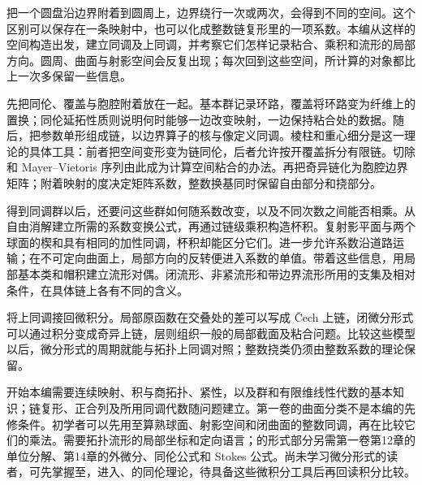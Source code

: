 
% 

\BookPartGuide
把一个圆盘沿边界附着到圆周上，边界绕行一次或两次，会得到不同的空间。这个区别可以保存在一条映射中，也可以化成整数链复形里的一项系数。本编从这样的空间构造出发，建立同调及上同调，并考察它们怎样记录粘合、乘积和流形的局部方向。圆周、曲面与射影空间会反复出现；每次回到这些空间，所计算的对象都比上一次多保留一些信息。

\ProseParagraphBreak

先把同伦、覆盖与胞腔附着放在一起。基本群记录环路，覆盖将环路变为纤维上的置换；同伦延拓性质则说明何时能够一边改变映射，一边保持粘合处的数据。随后，把参数单形组成链，以边界算子的核与像定义同调。棱柱和重心细分是这一理论的具体工具：前者把空间变形变为链同伦，后者允许按开覆盖拆分有限链。切除和 Mayer--Vietoris 序列由此成为计算空间粘合的办法。再把奇异链化为胞腔边界矩阵；附着映射的度决定矩阵系数，整数换基同时保留自由部分和挠部分。

\ProseParagraphBreak

得到同调群以后，还要问这些群如何随系数改变，以及不同次数之间能否相乘。从自由消解建立所需的系数变换公式，再通过链级乘积构造杯积。复射影平面与两个球面的楔和具有相同的加性同调，杯积却能区分它们。进一步允许系数沿道路运输；在不可定向曲面上，局部方向的反转便进入系数的单值。带着这些信息，用局部基本类和帽积建立流形对偶。闭流形、非紧流形和带边界流形所用的支集及相对条件，在具体链上各有不同的含义。

\ProseParagraphBreak

将上同调接回微积分。局部原函数在交叠处的差可以写成 Čech 上链，闭微分形式可以通过积分变成奇异上链，层则组织一般的局部截面及粘合问题。比较这些模型以后，微分形式的周期就能与拓扑上同调对照；整数挠类仍须由整数系数的理论保留。

\ProseParagraphBreak

开始本编需要连续映射、积与商拓扑、紧性，以及群和有限维线性代数的基本知识；链复形、正合列及所用同调代数随问题建立。第一卷的曲面分类不是本编的先修条件。初学者可以先用至算熟球面、射影空间和闭曲面的整数同调，再在比较它们的乘法。需要拓扑流形的局部坐标和定向语言；的形式部分另需第一卷第12章的单位分解、第14章的外微分、同伦公式和 Stokes 公式。尚未学习微分形式的读者，可先掌握至，进入、的同伦理论，待具备这些微积分工具后再回读积分比较。








